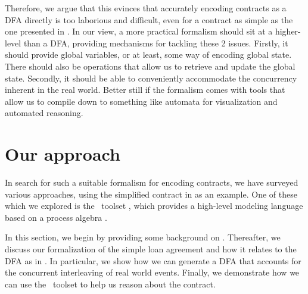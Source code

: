 \documentclass{article}
\begin{document}
Therefore, we argue that this evinces that accurately
encoding contracts as a DFA directly is too laborious and difficult,
even for a contract as simple as the one presented in
\cite[Fig 1.]{contract_as_automaton}.
In our view, a more practical formalism should sit at a higher-level than a DFA,
providing mechanisms for tackling these 2 issues.
Firstly, it should provide global variables, or at least, some way of encoding
global state.
There should also be operations that allow us to retrieve and update the global
state.
Secondly, it should be able to conveniently accommodate the concurrency
inherent in the real world.
Better still if the formalism comes with tools that allow us to compile down
to something like automata for visualization and automated reasoning.


\section{Our approach}

In search for such a suitable formalism for encoding contracts,
we have surveyed various approaches, using the simplified contract in
\cite[Fig 1.]{contract_as_automaton} as an example.
One of these which we explored is the \mcrl \, toolset
\cite{mcrl_toolset}, which provides a high-level modeling language based on a
process algebra \cite{mcrl_book}.

In this section, we begin by providing some background on \mcrl.
Thereafter, we discuss our formalization of the simple loan agreement and how
it relates to the DFA as in \cite{contract_as_automaton}.
In particular, we show how we can generate a DFA that accounts for the
concurrent interleaving of real world events.
Finally, we demonstrate how we can use the \mcrl \, toolset to help us reason
about the contract.
\end{document}
